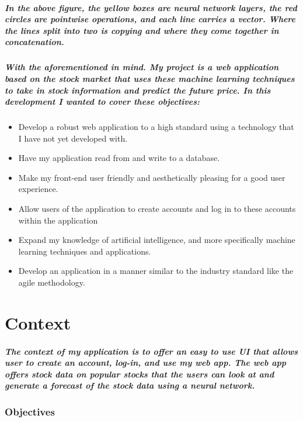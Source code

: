 \paragraph{In the above figure, the yellow boxes are neural network layers, the red circles are pointwise operations, and each line carries a vector. Where the lines split into two is copying and where they come together in concatenation.}

\paragraph{With the aforementioned in mind. My project is a web application based on the stock market that uses these machine learning techniques to take in stock information and predict the future price. In this development I wanted to cover these objectives: }

\begin{itemize}
    \item Develop a robust web application to a high standard using a technology that I have not yet developed with.
    \item Have my application read from and write to a database.
    \item Make my front-end user friendly and aesthetically pleasing for a good user experience.
    \item Allow users of the application to create accounts and log in to these accounts within the application
    \item Expand my knowledge of artificial intelligence, and more specifically machine learning techniques and applications.
    \item Develop an application in a manner similar to the industry standard like the agile methodology.
\end{itemize}

\chapter{Context}
\paragraph{The context of my application is to offer an easy to use UI that allows user to create an account, log-in, and use my web app. The web app offers stock data on popular stocks that the users can look at and generate a forecast of the stock data using a neural network.}

\subsection{Objectives}
